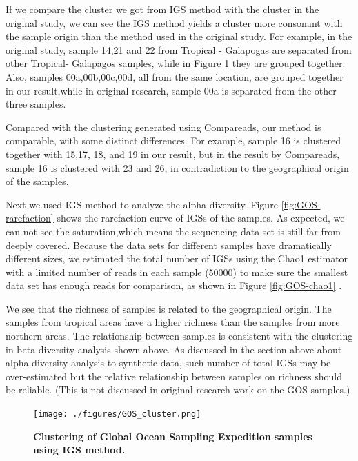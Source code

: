 If we compare the cluster we got from IGS method with the cluster in the original 
study, we can see the IGS method yields a
cluster more consonant with the sample origin
than the method used in the original 
study. For example, in the original study,
sample 14,21 and 22 from Tropical - Galapogas are separated from other 
Tropical- Galapagos samples, while in Figure \ref{fig:GOS-beta} 
they are grouped together. Also, samples 00a,00b,00c,00d, all from the 
same location, are grouped together in our result,while
in original research, sample 00a is separated from the other three samples.


Compared with the clustering generated using Compareads, our method is comparable, with some 
distinct differences. For example, sample 16 is clustered together with 15,17,
18, and 19 in our result, but in the result by Compareads, sample 16 is clustered 
with 23 and 26, in contradiction to the geographical origin of the samples.

Next we used IGS method to analyze the alpha diversity.
Figure \ref{fig:GOS-rarefaction} shows the rarefaction curve of IGSs of the samples.
As expected, we can not see the saturation,which means the sequencing data 
set is still far from deeply covered.
Because the data sets for different samples have dramatically different sizes, 
we estimated the total number of IGSs using the Chao1 estimator with a limited 
number of reads in each sample (50000) to make sure the smallest data set 
has enough reads for comparison, as shown in Figure \ref{fig:GOS-chao1} .

We see that the richness of samples is related to the geographical 
origin. The samples from tropical areas have a higher richness than
the samples from more northern areas. The relationship between samples is 
consistent with the clustering in beta diversity analysis shown above.
As discussed in the section above about alpha diversity analysis 
to synthetic data, such number of total IGSs may be over-estimated but
the relative relationship between samples on richness should be reliable.
(This is not discussed in original research work on the GOS samples.)

\begin{figure}[!ht]
 \centerline{\texttt{[image: ./figures/GOS\_cluster.png]}}
\caption{\bf Clustering of Global Ocean Sampling Expedition samples using IGS
method.}
\label{fig:GOS-beta}
\end{figure}

